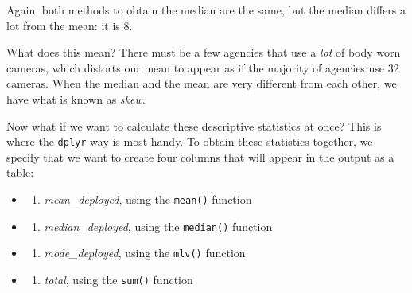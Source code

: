 \documentclass[
]{book}
\providecommand{\tightlist}{%
  \setlength{\itemsep}{0pt}\setlength{\parskip}{0pt}}
\begin{document}
Again, both methods to obtain the median are the same, but the median differs a lot from the mean: it is 8.

What does this mean? There must be a few agencies that use a \emph{lot} of body worn cameras, which distorts our mean to appear as if the majority of agencies use 32 cameras. When the median and the mean are very different from each other, we have what is known as \emph{skew}.

Now what if we want to calculate these descriptive statistics at once? This is where the \texttt{dplyr} way is most handy. To obtain these statistics together, we specify that we want to create four columns that will appear in the output as a table:

\begin{itemize}
\item
  \begin{enumerate}
  \def\labelenumi{(\arabic{enumi})}
  \tightlist
  \item
    \emph{mean\_deployed}, using the \texttt{mean()} function
  \end{enumerate}
\item
  \begin{enumerate}
  \def\labelenumi{(\arabic{enumi})}
  \setcounter{enumi}{1}
  \tightlist
  \item
    \emph{median\_deployed}, using the \texttt{median()} function
  \end{enumerate}
\item
  \begin{enumerate}
  \def\labelenumi{(\arabic{enumi})}
  \setcounter{enumi}{2}
  \tightlist
  \item
    \emph{mode\_deployed}, using the \texttt{mlv()} function
  \end{enumerate}
\item
  \begin{enumerate}
  \def\labelenumi{(\arabic{enumi})}
  \setcounter{enumi}{3}
  \tightlist
  \item
    \emph{total}, using the \texttt{sum()} function
  \end{enumerate}
\end{itemize}
\end{document}
